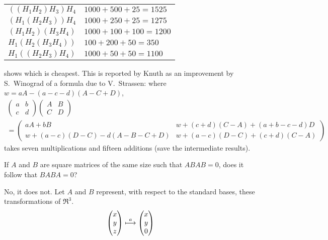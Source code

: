 \begin{exercises}
\begin{answer}
\begin{exparts}
\begin{center}
\begin{tabular}{l|l}
               \hline
               \( ((H_1H_2)H_3)H_4 \)     &\( 1000+500+25=1525 \)  \\
               \( (H_1(H_2H_3))H_4 \)     &\( 1000+250+25=1275 \)  \\
               \( (H_1H_2)(H_3H_4) \)     &\( 1000+100+100=1200 \)  \\
               \( H_1(H_2(H_3H_4)) \)     &\( 100+200+50=350    \)  \\
               \( H_1((H_2H_3)H_4) \)     &\( 1000+50+50=1100    \)
             \end{tabular}
           \end{center}
           shows which is cheapest.
         \partsitem This is reported by Knuth
           as an improvement by S.~Winograd of a formula due to
           V.~Strassen:
           where \( w=aA-(a-c-d)(A-C+D) \),
           \begin{multline*}
               \begin{pmatrix}
                 a  &b  \\
                 c  &d
               \end{pmatrix}
               \begin{pmatrix}
                 A  &B  \\
                 C  &D
                 \end{pmatrix}    \\
               =
               \begin{pmatrix}
                  aA+bB
                  &w+(c+d)(C-A)+(a+b-c-d)D \\
                  w+(a-c)(D-C)-d(A-B-C+D)
                  &w+(a-c)(D-C)+(c+d)(C-A)
               \end{pmatrix}
           \end{multline*}
           takes seven multiplications and fifteen additions (save the
           intermediate results).
      \end{exparts}  
    \end{answer}
  \puzzle \item  
    If \( A \) and \( B \) are square matrices of the
    same size such that \( ABAB=0 \), does it follow that \( BABA=0 \)?
    \cite{Putnam90A5}
    \begin{answer}
      \answerasgiven 
      No, it does not.
      Let \( A \) and \( B \) represent, with respect to the standard bases,
      these transformations of \( \Re^3 \).
      \begin{equation*}
        \colvec{x \\ y \\ z}\mapsunder{a}\colvec{x \\ y \\ 0}

\end{equation*}
\end{answer}
\end{exercises}
